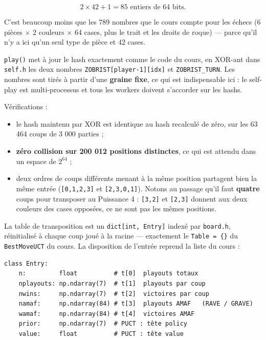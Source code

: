 \documentclass[11pt,a4paper]{article}
\begin{document}
\begin{equation*}
2 \times 42 + 1 = 85 \text{ entiers de 64 bits.}
\end{equation*}

C'est beaucoup moins que les 789 nombres que le cours compte pour les échecs
(6 pièces $\times$ 2 couleurs $\times$ 64 cases, plus le trait et les droits de roque) --- parce
qu'il n'y a ici qu'un seul type de pièce et 42 cases.

\texttt{play()} met à jour le hash exactement comme le code du cours, en XOR-ant
dans \texttt{self.h} les deux nombres \texttt{ZOBRIST[player-1][idx]} et
\texttt{ZOBRIST\_TURN}.
Les nombres sont tirés à partir d'une \textbf{graine fixe}, ce qui est indispensable
ici : le self-play est multi-processus et tous les workers doivent s'accorder sur
les hashs.

Vérifications :

\begin{itemize}
\setlength{\itemsep}{1pt}\setlength{\parskip}{0pt}
\item
  le hash maintenu par XOR est identique au hash recalculé de zéro, sur les
  63 464 coups de 3 000 parties ;
\item
  \textbf{zéro collision sur 200 012 positions distinctes}, ce qui est attendu dans un
  espace de $2^{64}$ ;
\item
  deux ordres de coups différents menant à la même position partagent bien la
  même entrée (\texttt{{[}0,1,2,3{]}} et \texttt{{[}2,3,0,1{]}}). Notons au passage qu'il faut
  \textbf{quatre} coups pour transposer au Puissance 4 : \texttt{{[}3,2{]}} et \texttt{{[}2,3{]}} donnent aux
  deux couleurs des cases opposées, ce ne sont pas les mêmes positions.
\end{itemize}

La table de transposition est un \texttt{dict{[}int,\ Entry{]}} indexé par \texttt{board.h},
réinitialisé à chaque coup joué à la racine --- exactement le \texttt{Table\ =\ \{\}} du
\texttt{BestMoveUCT} du cours. La disposition de l'entrée reprend la liste du cours :

\begin{lstlisting}[caption={Disposition d'une entrée de la table de transposition.},label={lst:entry}]
class Entry:
    n:         float          # t[0]  playouts totaux
    nplayouts: np.ndarray(7)  # t[1]  playouts par coup
    nwins:     np.ndarray(7)  # t[2]  victoires par coup
    namaf:     np.ndarray(84) # t[3]  playouts AMAF   (RAVE / GRAVE)
    wamaf:     np.ndarray(84) # t[4]  victoires AMAF
    prior:     np.ndarray(7)  # PUCT : tête policy
    value:     float          # PUCT : tête value
\end{lstlisting}
\end{document}
